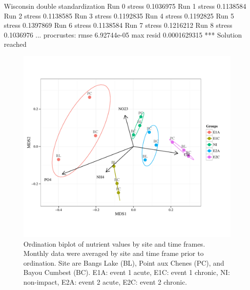 \documentclass[letterpaper,12pt]{article}\usepackage[]{graphicx}\usepackage[]{color}
\makeatletter
\def\maxwidth{ %
  \ifdim\Gin@nat@width>\linewidth
    \linewidth
  \else
    \Gin@nat@width
  \fi
}
\makeatother
\begin{document}
\clearpage

Wisconsin double standardization
Run 0 stress 0.1036975 
Run 1 stress 0.1138584 
Run 2 stress 0.1138585 
Run 3 stress 0.1192835 
Run 4 stress 0.1192825 
Run 5 stress 0.1397869 
Run 6 stress 0.1138584 
Run 7 stress 0.1216212 
Run 8 stress 0.1036976 
... procrustes: rmse 6.92744e-05  max resid 0.0001629315 
*** Solution reached
\begin{figure}[!ht]

{\centering \includegraphics[width=\maxwidth]{figs/pcafig-1} 

}

\caption[Ordination biplot of nutrient values by site and time frames]{Ordination biplot of nutrient values by site and time frames. Monthly data were averaged by site and time frame prior to ordination.  Site are Bangs Lake (BL), Point aux Chenes (PC), and Bayou Cumbest (BC). E1A: event 1 acute, E1C: event 1 chronic, NI: non-impact, E2A: event 2 acute, E2C: event 2 chronic.}\label{fig:pcafig}
\end{figure}


\clearpage
\end{document}
